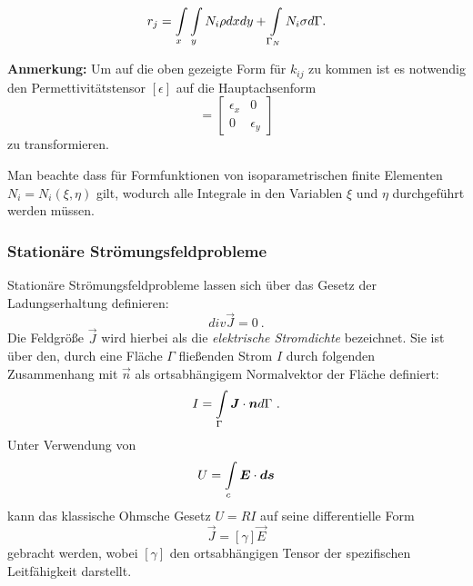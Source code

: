 \begin{equation}
\label{eq:right_side_e_static}
	r_j = \int\displaylimits_{x} \int\displaylimits_{y} N_i \rho dx dy + \int\displaylimits_{\Gamma_N} N_i\sigma d\Gamma.
\end{equation}

\textbf{Anmerkung:} Um auf die oben gezeigte Form für $k_{ij}$ zu kommen ist es notwendig den Permettivitätstensor $[\epsilon]$ auf die Hauptachsenform
\begin{equation*}
	[\epsilon] = \begin{bmatrix}
	\epsilon_x & 0 \\
	0 & \epsilon_y
	\end{bmatrix}
\end{equation*}
zu transformieren.\newline

Man beachte dass für Formfunktionen von isoparametrischen finite Elementen $N_i = N_i(\xi, \eta)$ gilt, wodurch alle Integrale in den Variablen $\xi$ und $\eta$ durchgeführt werden müssen.


\subsubsection{Stationäre Strömungsfeldprobleme}
\label{sec:stat_current_problems}
Stationäre Strömungsfeldprobleme lassen sich über das Gesetz der Ladungserhaltung definieren:
\begin{equation}
\label{eq:charge_presistence}
	\mathit{div}\vec{J} = 0\ .
\end{equation}
Die Feldgröße $\vec{J}$ wird hierbei als die \textit{elektrische Stromdichte} bezeichnet. Sie ist über den, durch eine Fläche $\Gamma$ fließenden Strom $I$ durch folgenden Zusammenhang mit $\vec{n}$ als ortsabhängigem Normalvektor der Fläche definiert:
\begin{equation}
I = \int\displaylimits_{\Gamma} \vec{J} \cdot \vec{n} d\Gamma\ .
\end{equation}
Unter Verwendung von 
\begin{equation}
	U = \int\displaylimits_{c} \vec{E}\cdot \vec{ds}
\end{equation} kann das klassische Ohmsche Gesetz $U=RI$ auf seine differentielle Form
\begin{equation}
\label{eq:ohm_diff_form}
 	\vec{J} = [\gamma] \vec{E}
 \end{equation}
gebracht werden, wobei $[\gamma]$ den ortsabhängigen Tensor der spezifischen Leitfähigkeit darstellt.\newline
 
